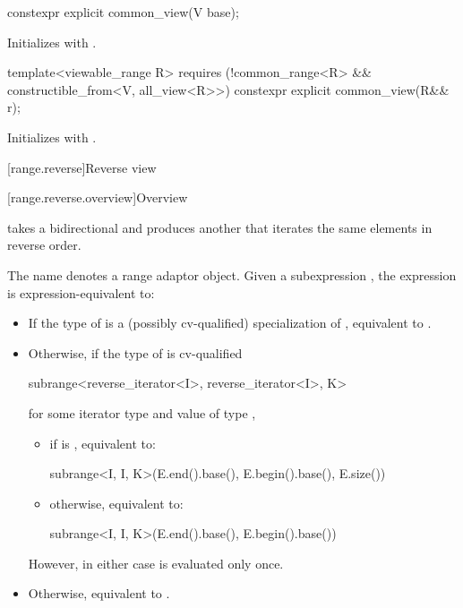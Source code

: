 %
\begin{itemdecl}
constexpr explicit common_view(V base);
\end{itemdecl}

\begin{itemdescr}
\pnum
\effects
Initializes  with .
\end{itemdescr}

%
\begin{itemdecl}
template<viewable_range R>
  requires (!common_range<R> && constructible_from<V, all_view<R>>)
constexpr explicit common_view(R&& r);
\end{itemdecl}

\begin{itemdescr}
\pnum
\effects
Initializes  with .
\end{itemdescr}

[range.reverse]{Reverse view}

[range.reverse.overview]{Overview}

\pnum
{} takes a bidirectional  and produces
another  that iterates the same elements in reverse order.

\pnum
The name  denotes a
range adaptor object.
Given a subexpression , the expression
 is expression-equivalent to:
\begin{itemize}
\item
  If the type of  is
  a (possibly cv-qualified) specialization of ,
  equivalent to .
\item
  Otherwise, if the type of  is cv-qualified
\begin{codeblock}
subrange<reverse_iterator<I>, reverse_iterator<I>, K>
\end{codeblock}
  for some iterator type  and
  value  of type ,
  \begin{itemize}
  \item
    if  is , equivalent to:
\begin{codeblock}
subrange<I, I, K>(E.end().base(), E.begin().base(), E.size())
\end{codeblock}
  \item
    otherwise, equivalent to:
\begin{codeblock}
subrange<I, I, K>(E.end().base(), E.begin().base())
\end{codeblock}
  \end{itemize}
  However, in either case  is evaluated only once.
\item
  Otherwise, equivalent to .
\end{itemize}

